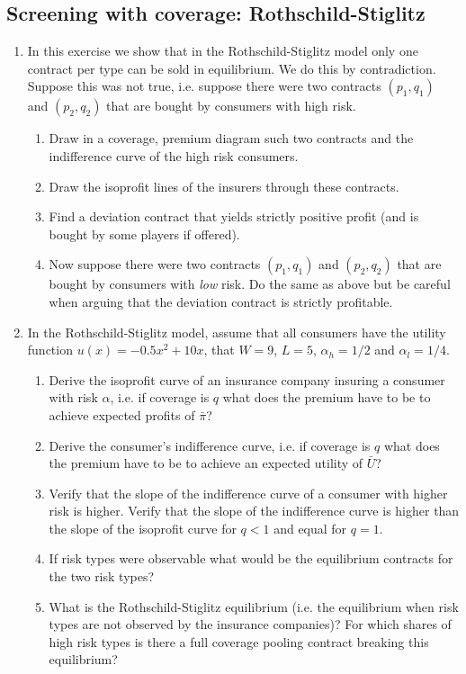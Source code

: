 \documentclass[a4paper]{article}
\begin{document}
\subsection{Screening with coverage: Rothschild-Stiglitz}
\label{sec:org800a0e5}
\begin{enumerate}[resume]
\item In this exercise we show that in the Rothschild-Stiglitz model only one contract per type can be sold in equilibrium. We do this by contradiction. Suppose this was not true, i.e. suppose there were two contracts \((p_1,q_1)\) and \((p_2,q_2)\) that are bought by consumers with high risk. 
\begin{enumerate}
\item Draw in a coverage, premium diagram such two contracts and the indifference curve of the high risk consumers.
\item Draw the isoprofit lines of the insurers through these contracts.
\item Find a deviation contract that yields strictly positive profit (and is bought by some players if offered).
\item Now suppose there were two contracts \((p_1,q_1)\) and \((p_2,q_2)\) that are bought by consumers with \emph{low} risk. Do the same as above but be careful when arguing that the deviation contract is strictly profitable.
\end{enumerate}

\item In the Rothschild-Stiglitz model, assume that all consumers have the utility function \(u(x)=-0.5x^2+10x\), that \(W=9\), \(L=5\), \(\alpha_h=1/2\) and \(\alpha_l=1/4\).
\begin{enumerate}
\item Derive the isoprofit curve of an insurance company insuring a consumer with risk \(\alpha\), i.e.   if coverage is \(q\) what does the premium have to be to achieve expected profits of \(\bar \pi\)?
\item Derive the consumer's indifference curve, i.e. if coverage is \(q\) what does the premium have to be to achieve an expected utility of \(\bar U\)?
\item Verify that the slope of the indifference curve of a consumer with higher risk is higher. Verify that the slope of the indifference curve is higher than the slope of the isoprofit curve for \(q<1\) and equal for \(q=1\).
\item If risk types were observable what would be the equilibrium contracts for the two risk types?
\item What is the Rothschild-Stiglitz equilibrium (i.e. the equilibrium when risk types are not observed by the insurance companies)? For which shares of high risk types is there a full coverage pooling contract breaking this equilibrium?
\end{enumerate}


\end{enumerate}
\end{document}

